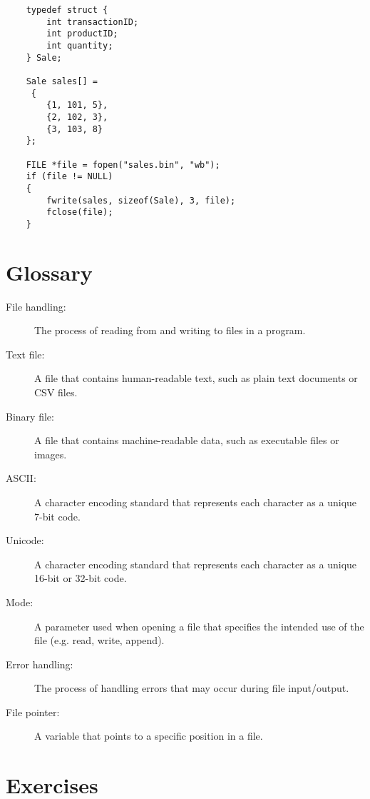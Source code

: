 \begin{verbatim}
	typedef struct {
		int transactionID;
		int productID;
		int quantity;
	} Sale;
	
	Sale sales[] =
	 {
		{1, 101, 5},
		{2, 102, 3},
		{3, 103, 8}
	};
	
	FILE *file = fopen("sales.bin", "wb");
	if (file != NULL) 
	{
		fwrite(sales, sizeof(Sale), 3, file);
		fclose(file);
	}
\end{verbatim}




\section{Glossary}

\begin{description}
	\item[File handling:] The process of reading from and writing to files in a program.
	\item[Text file:] A file that contains human-readable text, such as plain text documents or CSV files.
	\item[Binary file:] A file that contains machine-readable data, such as executable files or images.
	\item[ASCII:] A character encoding standard that represents each character as a unique 7-bit code.
	\item[Unicode:] A character encoding standard that represents each character as a unique 16-bit or 32-bit code.
	\item[Mode:] A parameter used when opening a file that specifies the intended use of the file (e.g. read, write, append).
	\item[Error handling:] The process of handling errors that may occur during file input/output.
	\item[File pointer:] A variable that points to a specific position in a file.
\end{description}

\section{Exercises}
\setcounter{exercisenum}{0}




